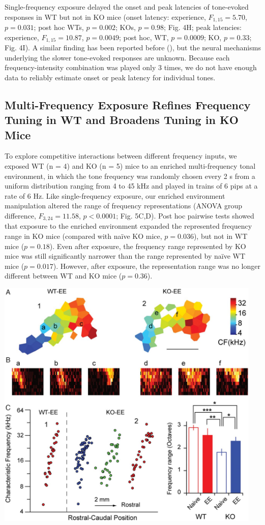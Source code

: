 Single-frequency exposure delayed the onset and peak latencies of tone-evoked responses in WT but not in KO mice (onset latency: experience, $F_{1,15}=5.70$, $p=0.031$; post hoc WTs, $p=0.002$; KOs, $p=0.98$; Fig. 4H; peak latencies: experience, $F_{1,15}=10.87$, $p=0.0049$; post hoc, WT, $p=0.0009$; KO, $p=0.33$; Fig. 4I). A similar finding has been reported before (\cite{Engineer2004}), but the neural mechanisms underlying the slower tone-evoked responses are unknown. Because each frequency-intensity combination was played only 3 times, we do not have enough data to reliably estimate onset or peak latency for individual tones.

\subsection{Multi-Frequency Exposure Refines Frequency Tuning in WT and Broadens Tuning in KO Mice}

To explore competitive interactions between different frequency inputs, we exposed WT (n = 4) and KO (n = 5) mice to an enriched multi-frequency tonal environment, in which the tone frequency was randomly chosen every 2 s from a uniform distribution ranging from 4 to 45 kHz and played in trains of 6 pips at a rate of 6 Hz. Like single-frequency exposure, our enriched environment manipulation altered the range of frequency representations (ANOVA group difference, $F_{3,24}=11.58$, $p<0.0001$; Fig. 5C,D). Post hoc pairwise tests showed that exposure to the enriched environment expanded the represented frequency range in KO mice (compared with na\"ive KO mice, $p=0.036$), but not in WT mice ($p=0.18$). Even after exposure, the frequency range represented by KO mice was still significantly narrower than the range represented by na\"ive WT mice ($p=0.017$). However, after exposure, the representation range was no longer different between WT and KO mice ($p=0.36$).

\centerline{\includegraphics[width=5in]{images/C3F5}}

